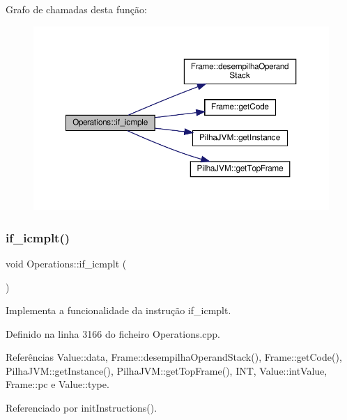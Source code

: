 Grafo de chamadas desta função\+:\nopagebreak
\begin{figure}[H]
\begin{center}
\leavevmode
\includegraphics[width=350pt]{classOperations_a7a5736e30fcd41a1bccb71c615c4e68d_cgraph}
\end{center}
\end{figure}
\mbox{\label{classOperations_a06f624059cfada3f4a726d0482078aaa}} 
\subsubsection{\texorpdfstring{if\+\_\+icmplt()}{if\_icmplt()}}
{\footnotesize\ttfamily void Operations\+::if\+\_\+icmplt (\begin{DoxyParamCaption}{ }\end{DoxyParamCaption})\hspace{0.3cm}{\ttfamily [private]}}



Implementa a funcionalidade da instrução if\+\_\+icmplt. 



Definido na linha 3166 do ficheiro Operations.\+cpp.



Referências Value\+::data, Frame\+::desempilha\+Operand\+Stack(), Frame\+::get\+Code(), Pilha\+J\+V\+M\+::get\+Instance(), Pilha\+J\+V\+M\+::get\+Top\+Frame(), I\+NT, Value\+::int\+Value, Frame\+::pc e Value\+::type.



Referenciado por init\+Instructions().

